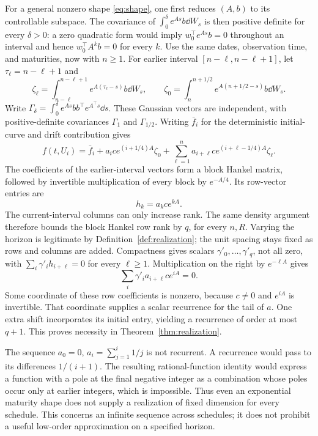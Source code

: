 For a general nonzero shape \eqref{eq:shape}, one first reduces $(A,b)$ to its controllable subspace. The covariance of $\int_0^\delta e^{As}b\dd W_s$ is then positive definite for every $\delta>0$: a zero quadratic form would imply $w_0^\top e^{As}b=0$ throughout an interval and hence $w_0^\top A^kb=0$ for every $k$. Use the same dates, observation time, and maturities, now with $n\ge1$. For earlier interval $[n-\ell,n-\ell+1]$, let $\tau_\ell=n-\ell+1$ and
\[
\zeta_\ell=\int_{n-\ell}^{n-\ell+1}e^{A(\tau_\ell-s)}b\dd W_s,
\qquad
\zeta_0=\int_n^{n+1/2}e^{A(n+1/2-s)}b\dd W_s.
\]
Write $\Gamma_\delta=\int_0^\delta e^{As}bb^\top e^{A^\top s}\dd s$. These Gaussian vectors are independent, with positive-definite covariances $\Gamma_1$ and $\Gamma_{1/2}$. Writing $\bar f_i$ for the deterministic initial-curve and drift contribution gives
\[
f(t,U_i)=\bar f_i+a_i c e^{(i+1/4)A}\zeta_0
 +\sum_{\ell=1}^n a_{i+\ell}c e^{(i+\ell-1/4)A}\zeta_\ell.
\]
The coefficients of the earlier-interval vectors form a block Hankel matrix, followed by invertible multiplication of every block by $e^{-A/4}$. Its row-vector entries are
\[
h_k=a_kc e^{kA}.
\]
The current-interval columns can only increase rank. The same density argument therefore bounds the block Hankel row rank by $q$, for every $n,R$. Varying the horizon is legitimate by Definition~\ref{def:realization}; the unit spacing stays fixed as rows and columns are added. Compactness gives scalars $\gamma'_0,\ldots,\gamma'_q$, not all zero, with $\sum_i \gamma'_i h_{i+\ell}=0$ for every $\ell\ge1$. Multiplication on the right by $e^{-\ell A}$ gives
\[
\sum_i \gamma'_i a_{i+\ell}c e^{iA}=0.
\]
Some coordinate of these row coefficients is nonzero, because $c\ne0$ and $e^{iA}$ is invertible. That coordinate supplies a scalar recurrence for the tail of $a$. One extra shift incorporates its initial entry, yielding a recurrence of order at most $q+1$. This proves necessity in Theorem~\ref{thm:realization}.

\begin{example}\label{ex:harmonic}
The sequence $a_0=0$, $a_i=\sum_{j=1}^i1/j$ is not recurrent. A recurrence would pass to its differences $1/(i+1)$. The resulting rational-function identity would express a function with a pole at the final negative integer as a combination whose poles occur only at earlier integers, which is impossible. Thus even an exponential maturity shape does not supply a realization of fixed dimension for every schedule. This concerns an infinite sequence across schedules; it does not prohibit a useful low-order approximation on a specified horizon.
\end{example}

